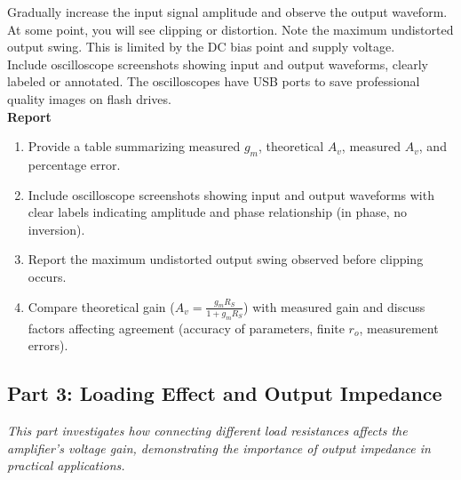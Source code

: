 \documentclass[10pt]{article}
\begin{document}
Gradually increase the input signal amplitude and observe the output waveform. At some point, you will see clipping or distortion. Note the maximum undistorted output swing.  This is limited by the DC bias point and supply voltage. \\


Include oscilloscope screenshots showing input and output waveforms, clearly labeled or annotated. The oscilloscopes have USB ports to save professional quality images on flash drives. \\

\textbf{Report}
\begin{enumerate}
    \item Provide a table summarizing measured $g_m$, theoretical $A_v$, measured $A_v$, and percentage error.
    \item Include oscilloscope screenshots showing input and output waveforms with clear labels indicating amplitude and phase relationship (in phase, no inversion).
    \item Report the maximum undistorted output swing observed before clipping occurs.
    \item Compare theoretical gain ($A_v = \frac{g_m R_S}{1 + g_m R_S}$) with measured gain and discuss factors affecting agreement (accuracy of parameters, finite $r_o$, measurement errors).\\
\end{enumerate}

\subsection{Part 3: Loading Effect and Output Impedance}

\textit{This part investigates how connecting different load resistances affects the amplifier's voltage gain, demonstrating the importance of output impedance in practical applications.} \\
\end{document}
